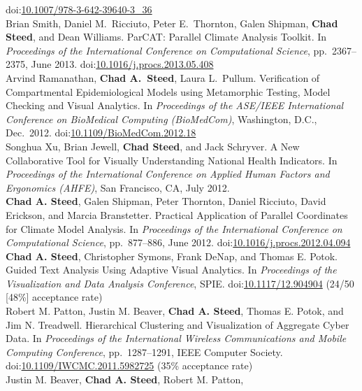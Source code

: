 \documentclass[11pt, letterpaper]{article}
\newcommand{\years}[1]{\marginnote{\scriptsize #1}}
\begin{document}
\begin{sloppypar}
doi:\href{http://dx.doi.org/10.1007/978-3-642-39640-3\_36}{10.1007/978-3-642-39640-3\_36} \\
\years{2013}Brian Smith, Daniel M.\ Ricciuto, Peter E.\ Thornton, Galen Shipman,
\textbf{Chad Steed}, and Dean Williams. ParCAT: Parallel Climate Analysis Toolkit.
In \emph{Proceedings of the International Conference on Computational
Science}, pp.\ 2367--2375, June 2013.
doi:\href{http://dx.doi.org/10.1016/j.procs.2013.05.408}{10.1016/j.procs.2013.05.408} \\
\years{2012}Arvind Ramanathan, \textbf{Chad A.\ Steed}, Laura L.\ Pullum.
Verification of Compartmental Epidemiological Models using Metamorphic Testing,
Model Checking and Visual Analytics. In \emph{Proceedings of the ASE/IEEE International
Conference on BioMedical Computing (BioMedCom)}, Washington, D.C., Dec.\ 2012.
doi:\href{http://dx.doi.org/10.1109/BioMedCom.2012.18}{10.1109/BioMedCom.2012.18} \\
\years{2012}Songhua Xu, Brian Jewell, \textbf{Chad Steed},
and Jack Schryver. A New Collaborative Tool for Visually Understanding
National Health Indicators. In \emph{Proceedings of the International
Conference on Applied Human Factors and Ergonomics (AHFE)}, San Francisco, CA,
July 2012.\\
\years{2012}\textbf{Chad A. Steed}, Galen Shipman, Peter Thornton, Daniel Ricciuto,
David Erickson, and Marcia Branstetter.  Practical Application of Parallel Coordinates for
Climate Model Analysis. In \emph{Proceedings of the International Conference on Computational
Science}, pp.\ 877--886, June 2012.
doi:\href{http://dx.doi.org/10.1016/j.procs.2012.04.094}
{10.1016/j.procs.2012.04.094} \\
\years{2012}\textbf{Chad A. Steed}, Christopher Symons, Frank DeNap, and
Thomas E. Potok. Guided Text Analysis Using Adaptive Visual Analytics. In
\emph{Proceedings of the Visualization and Data Analysis Conference}, SPIE.
doi:\href{http://dx.doi.org/10.1117/12.904904}{10.1117/12.904904} (24/50 [48\%] acceptance rate)\\
\years{2011}Robert M. Patton, Justin M. Beaver, \textbf{Chad A. Steed},
Thomas E. Potok, and Jim N. Treadwell. Hierarchical Clustering and
Visualization of Aggregate Cyber Data. In \emph{Proceedings of the International
Wireless Communications and Mobile Computing Conference}, pp.\ 1287--1291,
IEEE Computer Society. doi:\href{http://dx.doi.org/10.1109/IWCMC.2011.5982725}
{10.1109/IWCMC.2011.5982725} (35\% acceptance rate)\\
\years{2011}Justin M. Beaver, \textbf{Chad A. Steed}, Robert M. Patton,

\end{sloppypar}
\end{document}
